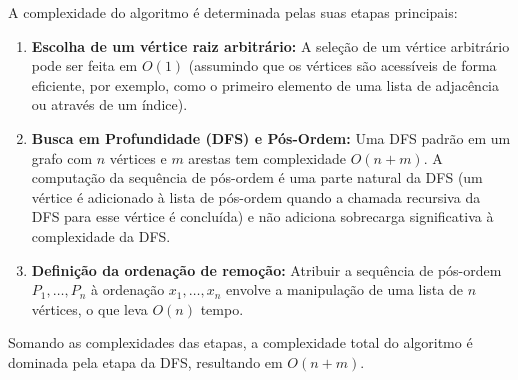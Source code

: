 \documentclass[11pt,reqno,a4paper]{amsart}
\theoremstyle{prova_style}
\begin{document}
A complexidade do algoritmo é determinada pelas suas etapas principais:
\begin{enumerate}[label=(\arabic*)]
    \item \textbf{Escolha de um vértice raiz arbitrário:} A seleção de um vértice arbitrário pode ser feita em $O(1)$ (assumindo que os vértices são acessíveis de forma eficiente, por exemplo, como o primeiro elemento de uma lista de adjacência ou através de um índice).
    \item \textbf{Busca em Profundidade (DFS) e Pós-Ordem:} Uma DFS padrão em um grafo com $n$ vértices e $m$ arestas tem complexidade $O(n+m)$. A computação da sequência de pós-ordem é uma parte natural da DFS (um vértice é adicionado à lista de pós-ordem quando a chamada recursiva da DFS para esse vértice é concluída) e não adiciona sobrecarga significativa à complexidade da DFS.
    \item \textbf{Definição da ordenação de remoção:} Atribuir a sequência de pós-ordem $P_1, \dots, P_n$ à ordenação $x_1, \dots, x_n$ envolve a manipulação de uma lista de $n$ vértices, o que leva $O(n)$ tempo.
\end{enumerate}
Somando as complexidades das etapas, a complexidade total do algoritmo é dominada pela etapa da DFS, resultando em $O(n+m)$.
\end{document}
